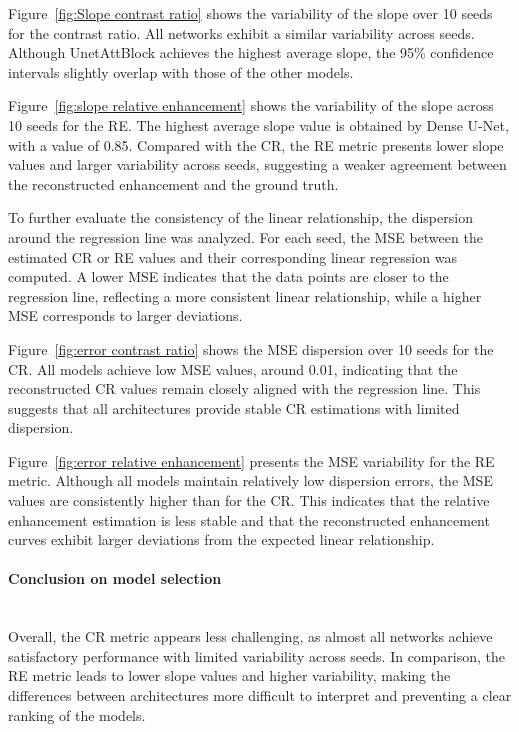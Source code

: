 \documentclass[12pt]{article}
\begin{document}
Figure~\ref{fig:Slope contrast ratio} shows the variability of the slope over 10 seeds for the contrast ratio.
All networks exhibit a similar variability across seeds.
Although UnetAttBlock achieves the highest average slope, the 95\% confidence intervals slightly overlap with those of the other models.
\vspace{0.5cm}

Figure~\ref{fig:slope relative enhancement} shows the variability of the slope across 10 seeds for the RE.
The highest average slope value is obtained by Dense U-Net, with a value of 0.85.
Compared with the CR, the RE metric presents lower slope values and larger variability across seeds, suggesting a weaker agreement between the reconstructed enhancement and the ground truth.
\vspace{0.5cm}

To further evaluate the consistency of the linear relationship, the dispersion around the regression line was analyzed. 
For each seed, the MSE between the estimated CR or RE values and their corresponding linear regression was computed. 
A lower MSE indicates that the data points are closer to the regression line, reflecting a more consistent linear relationship, while a higher MSE corresponds to larger deviations.
\vspace{0.5cm}

Figure~\ref{fig:error contrast ratio} shows the MSE dispersion over 10 seeds for the CR.
All models achieve low MSE values, around 0.01, indicating that the reconstructed CR values remain closely aligned with the regression line.
This suggests that all architectures provide stable CR estimations with limited dispersion.
\vspace{0.5cm}

Figure~\ref{fig:error relative enhancement} presents the MSE variability for the RE metric.
Although all models maintain relatively low dispersion errors, the MSE values are consistently higher than for the CR. 
This indicates that the relative enhancement estimation is less stable and that the reconstructed enhancement curves exhibit larger deviations from the expected linear relationship.


\paragraph{Conclusion on model selection}
\mbox{}\\

Overall, the CR metric appears less challenging, as almost all networks achieve satisfactory performance with limited variability across seeds. 
In comparison, the RE metric leads to lower slope values and higher variability, making the differences between architectures more difficult to interpret and preventing a clear ranking of the models.
\vspace{0.5cm}
\end{document}
